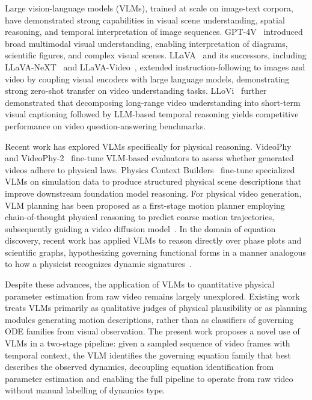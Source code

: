 \documentclass[runningheads]{llncs}
\begin{document}
Large vision-language models (VLMs), trained at scale on image-text corpora, have demonstrated strong capabilities in visual scene understanding, spatial reasoning, and temporal interpretation of image sequences. GPT-4V~\cite{roumeliotis2023chatgpt} introduced broad multimodal visual understanding, enabling interpretation of diagrams, scientific figures, and complex visual scenes. LLaVA~\cite{liu2023visual} and its successors, including LLaVA-NeXT~\cite{liu2024llavanext} and LLaVA-Video~\cite{zhang2024llava}, extended instruction-following to images and video by coupling visual encoders with large language models, demonstrating strong zero-shot transfer on video understanding tasks. LLoVi~\cite{zhang2024simple} further demonstrated that decomposing long-range video understanding into short-term visual captioning followed by LLM-based temporal reasoning yields competitive performance on video question-answering benchmarks.

Recent work has explored VLMs specifically for physical reasoning. VideoPhy~\cite{bansal2024videophy} and VideoPhy-2~\cite{bansal2025videophy} fine-tune VLM-based evaluators to assess whether generated videos adhere to physical laws. Physics Context Builders~\cite{balazadeh2025physics} fine-tune specialized VLMs on simulation data to produce structured physical scene descriptions that improve downstream foundation model reasoning. For physical video generation, VLM planning has been proposed as a first-stage motion planner employing chain-of-thought physical reasoning to predict coarse motion trajectories, subsequently guiding a video diffusion model~\cite{ho2022video}. In the domain of equation discovery, recent work has applied VLMs to reason directly over phase plots and scientific graphs, hypothesizing governing functional forms in a manner analogous to how a physicist recognizes dynamic signatures~\cite{liu2025mimicking}.

Despite these advances, the application of VLMs to quantitative physical parameter estimation from raw video remains largely unexplored. Existing work treats VLMs primarily as qualitative judges of physical plausibility or as planning modules generating motion descriptions, rather than as classifiers of governing ODE families from visual observation. The present work proposes a novel use of VLMs in a two-stage pipeline: given a sampled sequence of video frames with temporal context, the VLM identifies the governing equation family that best describes the observed dynamics, decoupling equation identification from parameter estimation and enabling the full pipeline to operate from raw video without manual labelling of dynamics type.
\end{document}
